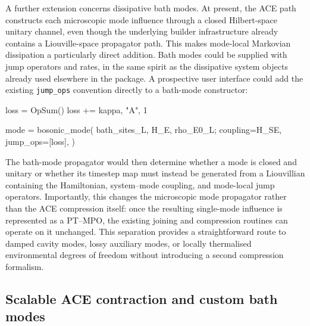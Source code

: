 A further extension concerns dissipative bath modes.
At present, the ACE path constructs each microscopic mode influence through a closed Hilbert-space unitary channel, even though the underlying builder infrastructure already contains a Liouville-space propagator path.
This makes mode-local Markovian dissipation a particularly direct addition.
Bath modes could be supplied with jump operators and rates, in the same spirit as the dissipative system objects already used elsewhere in the package.
A prospective user interface could add the existing \texttt{jump\_ops} convention directly to a bath-mode constructor:
%
\begin{juliacode}[
    caption={Prospective interface to define a lossy bosonic bath mode.},
    label={lst:roadmap-dissipative-bath-mode},
]
loss = OpSum()
loss += kappa, "A", 1

mode = bosonic_mode(
    bath_sites_L,
    H_E,
    rho_E0_L;
    coupling=H_SE,
    jump_ops=[loss],
)
\end{juliacode}
%
The bath-mode propagator would then determine whether a mode is closed and unitary or whether its timestep map must instead be generated from a Liouvillian containing the Hamiltonian, system--mode coupling, and mode-local jump operators.
Importantly, this changes the microscopic mode propagator rather than the ACE compression itself: once the resulting single-mode influence is represented as a PT--MPO, the existing joining and compression routines can operate on it unchanged.
This separation provides a straightforward route to damped cavity modes, lossy auxiliary modes, or locally thermalised environmental degrees of freedom without introducing a second compression formalism.

\subsection{Scalable ACE contraction and custom bath modes}
\label{subsec:roadmap-ace}

